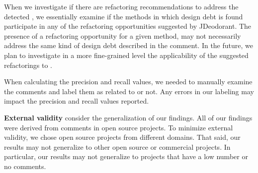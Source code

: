 When we investigate if there are refactoring recommendations to address the detected \SADTD, we essentially examine if the methods in which design debt is found participate in any of the refactoring opportunities suggested by JDeodorant.
The presence of a refactoring opportunity for a given method, may not necessarily address the same kind of design debt described in the comment. In the future, we plan to investigate in a more fine-grained level the applicability of the suggested refactorings to \SADTD.

When calculating the precision and recall values, we needed to manually examine the comments and label them as related to \SADTD or not. Any errors in our labeling may impact the precision and recall values reported.


\noindent \textbf{External validity} consider the generalization of our findings. All of our findings were derived from comments in open source projects. To minimize external validity, we chose open source projects from different domains. That said, our results may not generalize to other open source or commercial projects. In particular, our results may not generalize to projects that have a low number or no comments.
